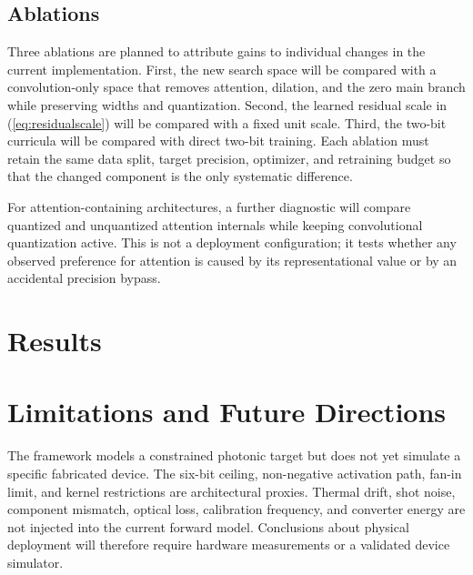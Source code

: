 \documentclass[lettersize,journal]{IEEEtran}
\begin{document}
\subsection{Ablations}
Three ablations are planned to attribute gains to individual changes in the current implementation. First, the new search space will be compared with a convolution-only space that removes attention, dilation, and the zero main branch while preserving widths and quantization. Second, the learned residual scale in (\ref{eq:residualscale}) will be compared with a fixed unit scale. Third, the two-bit curricula will be compared with direct two-bit training. Each ablation must retain the same data split, target precision, optimizer, and retraining budget so that the changed component is the only systematic difference.

For attention-containing architectures, a further diagnostic will compare quantized and unquantized attention internals while keeping convolutional quantization active. This is not a deployment configuration; it tests whether any observed preference for attention is caused by its representational value or by an accidental precision bypass.

\clearpage
\section{Results}
\vspace*{\fill}
\clearpage
\mbox{}\vfill
\clearpage
\mbox{}\vfill
\clearpage

\section{Limitations and Future Directions}
The framework models a constrained photonic target but does not yet simulate a specific fabricated device. The six-bit ceiling, non-negative activation path, fan-in limit, and kernel restrictions are architectural proxies. Thermal drift, shot noise, component mismatch, optical loss, calibration frequency, and converter energy are not injected into the current forward model. Conclusions about physical deployment will therefore require hardware measurements or a validated device simulator.
\end{document}
